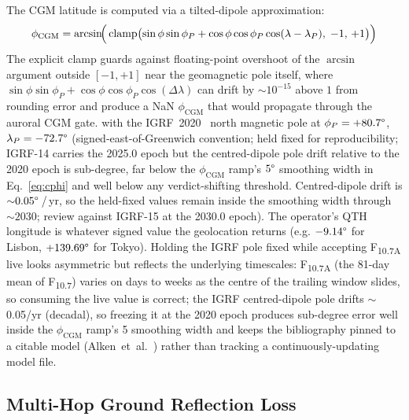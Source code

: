 \documentclass[11pt,a4paper]{article}
\begin{document}
The CGM latitude is computed via a tilted-dipole approximation:
\begin{equation}\label{eq:cgm}
  \phi_{\text{CGM}} = \arcsin\!\Bigl(\,\text{clamp}\bigl(
    \sin\phi\sin\phi_P + \cos\phi\cos\phi_P\cos(\lambda - \lambda_P),\;
    -1,\, +1\bigr)\Bigr)
\end{equation}
The explicit clamp guards against floating-point overshoot of the
$\arcsin$ argument outside $[-1, +1]$ near the geomagnetic pole
itself, where $\sin\phi\sin\phi_P + \cos\phi\cos\phi_P\cos(\Delta\lambda)$
can drift by ${\sim}10^{-15}$ above $1$ from rounding error and
produce a NaN $\phi_{\text{CGM}}$ that would propagate through the
auroral CGM gate.
with the IGRF~2020~\cite{igrf13} north magnetic pole at
$\phi_P = +80.7\text{\textdegree}$,
$\lambda_P = -72.7\text{\textdegree}$ (signed-east-of-Greenwich
convention; held fixed for reproducibility;
IGRF-14 carries the 2025.0 epoch but the centred-dipole
pole drift relative to the 2020 epoch is sub-degree, far below the
$\phi_{\text{CGM}}$ ramp's $5\text{\textdegree}$ smoothing width
in Eq.~\ref{eq:cphi} and well below any verdict-shifting threshold.
Centred-dipole drift is ${\sim}0.05\text{\textdegree}$\,/\,yr, so
the held-fixed values remain inside the smoothing width through
$\sim 2030$; review against IGRF-15 at the 2030.0 epoch).  The
operator's QTH longitude is whatever signed value the geolocation
returns (e.g. $-9.14\text{\textdegree}$ for Lisbon, $+139.69\text{\textdegree}$
for Tokyo).  Holding the IGRF pole fixed while accepting
F\textsubscript{10.7A} live looks asymmetric but reflects the
underlying timescales: F\textsubscript{10.7A} (the 81-day mean
of F\textsubscript{10.7}) varies on days to weeks as the centre
of the trailing window slides, so consuming the live value is
correct; the IGRF centred-dipole pole drifts
$\sim$0.05\textdegree/yr (decadal), so freezing it at the 2020
epoch produces sub-degree error well inside the
$\phi_{\text{CGM}}$ ramp's 5\textdegree{} smoothing width and
keeps the bibliography pinned to a citable model
(Alken~et~al.~\cite{igrf13}) rather than tracking a
continuously-updating model file.

\subsection{Multi-Hop Ground Reflection Loss}\label{sec:lhop}
\end{document}
